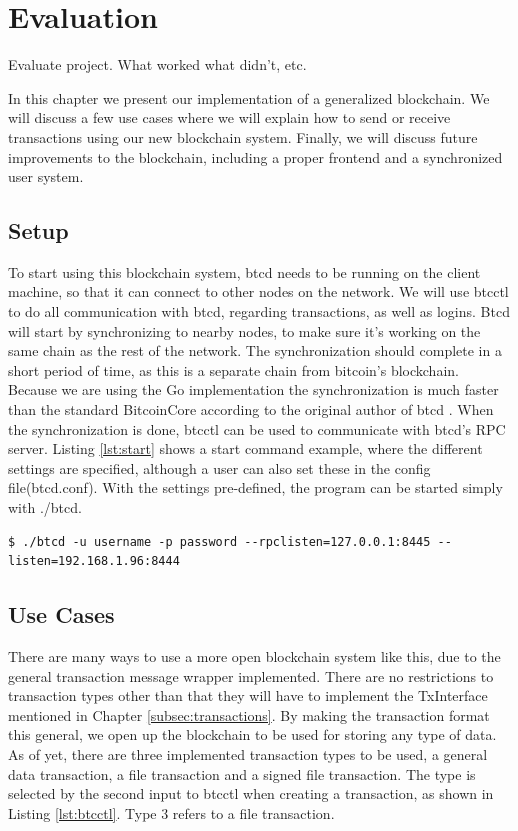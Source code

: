 \documentclass[12pt]{article}
\begin{document}
\section{Evaluation}
Evaluate project. What worked what didn't, etc. 

In this chapter we present our implementation of a generalized blockchain. We will discuss a few use cases where we will explain how to send or receive transactions using our new blockchain system. Finally, we will discuss future improvements to the blockchain, including a proper frontend and a synchronized user system.

\subsection{Setup}
To start using this blockchain system, btcd needs to be running on the client machine, so that it can connect to other nodes on the network. We will use btcctl to do all communication with btcd, regarding transactions, as well as logins. Btcd will start by synchronizing to nearby nodes, to make sure it's working on the same chain as the rest of the network. The synchronization should complete in a short period of time, as this is a separate chain from bitcoin's blockchain. Because we are using the Go implementation the synchronization is much faster than the standard BitcoinCore according to the original author of btcd \cite{davec}. When the synchronization is done, btcctl can be used to communicate with btcd's RPC server. Listing \ref{lst:start} shows a start command example, where the different settings are specified, although a user can also set these in the config file(btcd.conf). With the settings pre-defined, the program can be started simply with ./btcd.

\begin{lstlisting}[float=h!,caption={Start-up command example},label=lst:start]
$ ./btcd -u username -p password --rpclisten=127.0.0.1:8445 --listen=192.168.1.96:8444
\end{lstlisting}

\subsection{Use Cases}
There are many ways to use a more open blockchain system like this, due to the general transaction message wrapper implemented. There are no restrictions to transaction types other than that they will have to implement the TxInterface mentioned in Chapter \ref{subsec:transactions}. By making the transaction format this general, we open up the blockchain to be used for storing any type of data. As of yet, there are three implemented transaction types to be used, a general data transaction, a file transaction and a signed file transaction. The type is selected by the second input to btcctl when creating a transaction, as shown in Listing \ref{lst:btcctl}. Type 3 refers to a file transaction.
\end{document}
